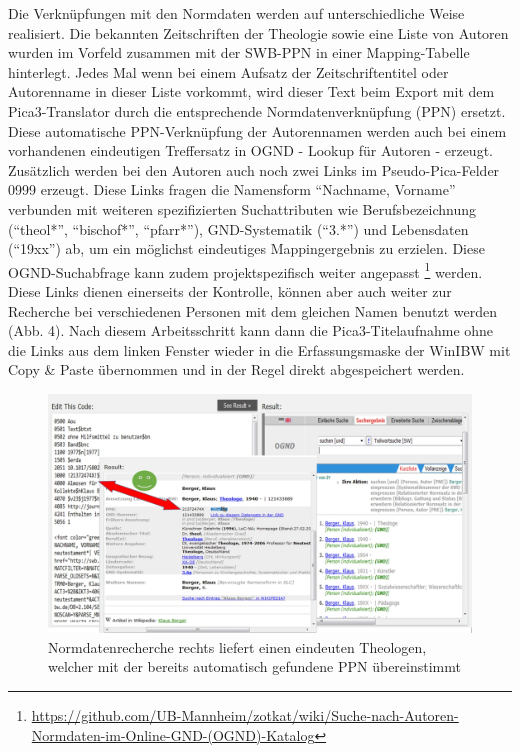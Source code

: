 \documentclass[a4paper,
fontsize=11pt,
oneside,
numbers=noperiodatend,
parskip=half-,
bibliography=totoc,
final
]{scrartcl}
\begin{document}
Die Verknüpfungen mit den Normdaten werden auf unterschiedliche Weise
realisiert. Die bekannten Zeitschriften der Theologie sowie eine Liste
von Autoren wurden im Vorfeld zusammen mit der SWB-PPN in einer
Mapping-Tabelle hinterlegt. Jedes Mal wenn bei einem Aufsatz der
Zeitschriftentitel oder Autorenname in dieser Liste vorkommt, wird
dieser Text beim Export mit dem Pica3-Translator durch die entsprechende
Normdatenverknüpfung (PPN) ersetzt. Diese automatische PPN-Verknüpfung
der Autorennamen werden auch bei einem vorhandenen eindeutigen
Treffersatz in OGND - Lookup für Autoren - erzeugt. Zusätzlich werden
bei den Autoren auch noch zwei Links im Pseudo-Pica-Felder 0999 erzeugt.
Diese Links fragen die Namensform \enquote{Nachname, Vorname} verbunden
mit weiteren spezifizierten Suchattributen wie Berufsbezeichnung
(\enquote{theol*}, \enquote{bischof*}, \enquote{pfarr*}), GND-Systematik
(\enquote{3.*}) und Lebensdaten (\enquote{19xx}) ab, um ein möglichst
eindeutiges Mappingergebnis zu erzielen. Diese OGND-Suchabfrage kann
zudem projektspezifisch weiter angepasst \footnote{\url{https://github.com/UB-Mannheim/zotkat/wiki/Suche-nach-Autoren-Normdaten-im-Online-GND-(OGND)-Katalog}}
werden. Diese Links dienen einerseits der Kontrolle, können aber auch
weiter zur Recherche bei verschiedenen Personen mit dem gleichen Namen
benutzt werden (Abb. 4). Nach diesem Arbeitsschritt kann dann die
Pica3-Titelaufnahme ohne die Links aus dem linken Fenster wieder in die
Erfassungsmaske der WinIBW mit Copy \& Paste übernommen und in der Regel
direkt abgespeichert werden.

\begin{figure}[htbp]
\centering
\includegraphics{img/Normdatenrecherche.jpg}
\caption{Normdatenrecherche rechts liefert einen eindeuten Theologen,
welcher mit der bereits automatisch gefundene PPN übereinstimmt}
\end{figure}
\end{document}
